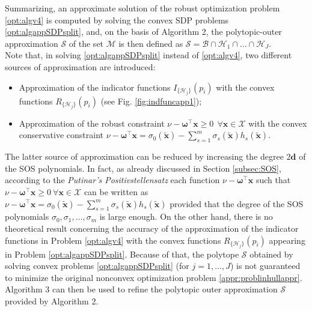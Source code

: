 \documentclass[twocolumn]{autart}
\newcommand{\DP}[1]{{#1}}
\newcommand{\xaug}{\tilde{\mathbf{x}}}
\newcommand{\relorder}{\DP{\mathbf{d}}}
\begin{document}
Summarizing, an approximate solution of the robust optimization problem \eqref{opt:algv4} is   computed by solving the convex SDP  problems \eqref{opt:algappSDPsplit}, and, on the basis of Algorithm 2, the polytopic-outer approximation $\mathcal{S}$ of the set $\mathcal{M}$ is then defined as $\mathcal{S}= \mathcal{B} \cap \mathcal{H}_1^{} \cap \ldots \cap \mathcal{H}_{J}^{}$. \\
Note that, in solving \eqref{opt:algappSDPsplit} instead of \eqref{opt:algv4}, two different sources of approximation are introduced:
\begin{itemize}
  \item Approximation of the indicator functions $I_{\{\mathcal{H}_j\}}(p_i)$ with the convex functions $R_{\{\mathcal{H}_j\}}(p_i)$ (see Fig. \ref{fig:indfuncapp1});
  \item Approximation of the robust constraint $\nu -\boldsymbol{\omega}^{{\top}}\mathbf{x}  \geq 0 \ \ \forall \mathbf{x} \in \mathcal{X}$ with the convex conservative constraint $\nu -\boldsymbol{\omega}^{{\top}}\mathbf{x} =\sigma_0(\xaug)-\sum_{s=1}^m \sigma_s(\xaug) h_s(\xaug)$.
\end{itemize}
The latter source of approximation can be reduced by increasing the degree $2\relorder$ of the SOS polynomials. In fact, as already discussed in Section \ref{subsec:SOS}, according to the  \emph{Putinar's Positivstellensatz} each function $\nu -\boldsymbol{\omega}^{{\top}}\mathbf{x}$ such that $\nu -\boldsymbol{\omega}^{{\top}}\mathbf{x} \geq 0 \ \forall \mathbf{x} \in \mathcal{X}$ can be written as $ \nu -\boldsymbol{\omega}^{{\top}}\mathbf{x}=\sigma_0(\xaug)-\sum_{s=1}^m \sigma_s(\xaug) h_s(\xaug)$ provided that the degree of the SOS polynomials $\sigma_0, \sigma_1, \ldots, \sigma_m$ is large enough.
On the other hand, there is no theoretical result concerning the accuracy of the approximation of the indicator functions in Problem \eqref{opt:algv4} with the convex functions $R_{\{\mathcal{H}_j\}}(p_i)$  appearing in Problem \eqref{opt:algappSDPsplit}.
Because of that, the polytope  $\mathcal{S}$ obtained by solving convex problems \eqref{opt:algappSDPsplit} (for $j=1,\ldots,J$) is not guaranteed to minimize the original nonconvex optimization problem \eqref{appr:problinhullappr}.  Algorithm 3 can then be used to   refine the polytopic outer approximation $\mathcal{S}$ provided by Algorithm 2.
\end{document}
